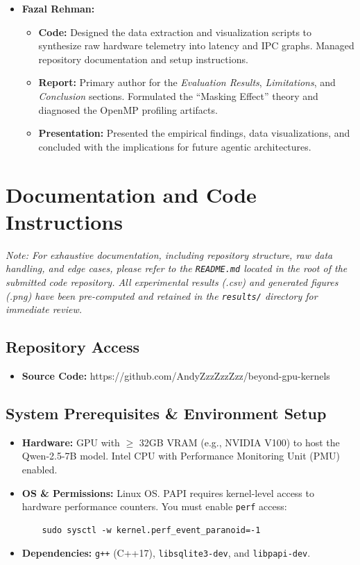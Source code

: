 \documentclass[10pt, letterpaper]{article}
\begin{document}
\begin{itemize}
    \item \textbf{Fazal Rehman:}
    \begin{itemize}
        \item \textbf{Code:} Designed the data extraction and visualization scripts to synthesize raw hardware telemetry into latency and IPC graphs. Managed repository documentation and setup instructions.
        \item \textbf{Report:} Primary author for the \textit{Evaluation Results}, \textit{Limitations}, and \textit{Conclusion} sections. Formulated the ``Masking Effect'' theory and diagnosed the OpenMP profiling artifacts.
        \item \textbf{Presentation:} Presented the empirical findings, data visualizations, and concluded with the implications for future agentic architectures.
    \end{itemize}
\end{itemize}

\section{Documentation and Code Instructions}

\noindent \textit{Note: For exhaustive documentation, including repository structure, raw data handling, and edge cases, please refer to the \texttt{README.md} located in the root of the submitted code repository. All experimental results (.csv) and generated figures (.png) have been pre-computed and retained in the \texttt{results/} directory for immediate review.}

\subsection{Repository Access}
\begin{itemize}
    \item \textbf{Source Code:} https://github.com/AndyZzzZzzZzz/beyond-gpu-kernels
\end{itemize}

\subsection{System Prerequisites \& Environment Setup}
\begin{itemize}
    \item \textbf{Hardware:} GPU with $\ge$ 32GB VRAM (e.g., NVIDIA V100) to host the Qwen-2.5-7B model. Intel CPU with Performance Monitoring Unit (PMU) enabled.
    \item \textbf{OS \& Permissions:} Linux OS. PAPI requires kernel-level access to hardware performance counters. You must enable \texttt{perf} access:
    \begin{verbatim}
    sudo sysctl -w kernel.perf_event_paranoid=-1
    \end{verbatim}
    \item \textbf{Dependencies:} \texttt{g++} (C++17), \texttt{libsqlite3-dev}, and \texttt{libpapi-dev}.
\end{itemize}
\end{document}
